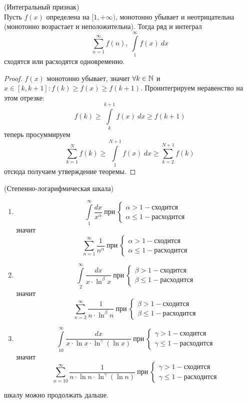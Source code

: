 \begin{theorem} (Интегральный признак) \\
    Пусть $f(x)$ определена на $[1,+\infty)$, монотонно убывает и неотрицательна (монотонно возрастает и неположительна). Тогда ряд и интеграл
    \[\sum_{n=1}^{\infty}f(n),\ \int\limits_{1}^{\infty}f(x)\ dx\]
    сходятся или расходятся одновременно.
\end{theorem}
\begin{proof}
    $f(x)$ монотонно убывает, значит $\forall k\in \mathbb{N}$ и $x\in [k, k+1]: f(k)\geq f(x)\geq f(k+1)$. Проинтегрируем неравенство на этом отрезке:
    \[f(k)\geq \int\limits_{k}^{k+1}f(x)\ dx\geq f(k+1)\]
    теперь просуммируем
    \[\sum_{k=1}^{N}f(k)\geq \int\limits_{1}^{N+1}f(x)\ dx\geq \sum_{k=2}^{N+1}f(k)\]
    отсюда получаем утверждение теоремы.
\end{proof}
\begin{example}(Степенно-логарифмическая шкала)
    \begin{enumerate}
        \item 
    \[\int\limits_{1}^{\infty}\frac{dx}{x^{\alpha}}\ \text{при}\ 
    \begin{cases}
        \alpha>1 - \text{сходится}\\
        \alpha\leq 1 - \text{расходится}
    \end{cases}\]
    значит
    \[\sum_{n=1}^{\infty}\frac{1}{n^{\alpha}}\ \text{при}\ 
    \begin{cases}
        \alpha>1 - \text{сходится}\\
        \alpha\leq 1 - \text{расходится}
    \end{cases}\]
    \item
    \[\int\limits_{2}^{\infty}\frac{dx}{x\cdot \ln^{\beta}{x}}\ \text{при}\ 
    \begin{cases}
        \beta>1 - \text{сходится}\\
        \beta\leq 1 - \text{расходится}
    \end{cases}\]
    значит
    \[\sum_{n=2}^{\infty}\frac{1}{n\cdot \ln^{\beta}{n}}\ \text{при}\ 
    \begin{cases}
        \beta>1 - \text{сходится}\\
        \beta\leq 1 - \text{расходится}
    \end{cases}\]
    \item
    \[\int\limits_{10}^{\infty}\frac{dx}{x\cdot \ln{x}\cdot \ln^{\gamma}{(\ln{x})}}\ \text{при}\ 
    \begin{cases}
        \gamma>1 - \text{сходится}\\
        \gamma\leq 1 - \text{расходится}
    \end{cases}\]
    значит
    \[\sum_{n=10}^{\infty}\frac{1}{n\cdot \ln{n}\cdot \ln^{\gamma}{(\ln{n})}}\ \text{при}\ 
    \begin{cases}
        \gamma>1 - \text{сходится}\\
        \gamma\leq 1 - \text{расходится}
    \end{cases}\]
    \end{enumerate}
    шкалу можно продолжать дальше.
\end{example}
